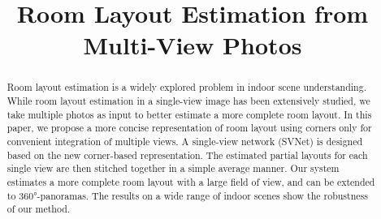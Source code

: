 \documentclass[sigconf]{acmart}
\newcommand{\comments}[1]{}
\begin{document}
\title{Room Layout Estimation from Multi-View Photos}

\comments{
\author{Ruifeng Deng}
\orcid{1234-5678-9012}
\affiliation{%
  \institution{University of Science and Technology of China}
  \streetaddress{P.O. Box 1212}
  \city{Hefei}
  \country{China}
  \postcode{43017-6221}
}
\email{trovato@corporation.com}

\author{Chaoyu Xie}
\affiliation{%
  \institution{University of Science and Technology of China}
  \streetaddress{P.O. Box 1212}
  \city{Hefei}
  \country{China}
  \postcode{43017-6221}
}
\email{webmaster@marysville-ohio.com}

\author{Xuejin Chen}
\affiliation{%
  \institution{University of Science and Technology of China}
  \streetaddress{1 Th{\o}rv{\"a}ld Circle}
  \city{Hefei}
  \country{China}}
\email{larst@affiliation.org}


\renewcommand{\shortauthors}{B. Trovato et al.}
}

\begin{abstract}
Room layout estimation is a widely explored problem in indoor scene understanding. %
While room layout estimation in a single-view image has been extensively studied, we take multiple photos as input to better estimate a more complete room layout. 
% 
In this paper, we propose a more concise representation of room layout using corners only for convenient integration of multiple views. 
% 
A single-view network (SVNet) is designed based on the new corner-based representation. 
The estimated partial layouts for each single view are then stitched together in a simple average manner.
Our system estimates a more complete room layout with a large field of view, and can be extended to \ang{360}-panoramas. 
The results on a wide range of indoor scenes show the robustness of our method. 
\end{abstract}
\end{document}
